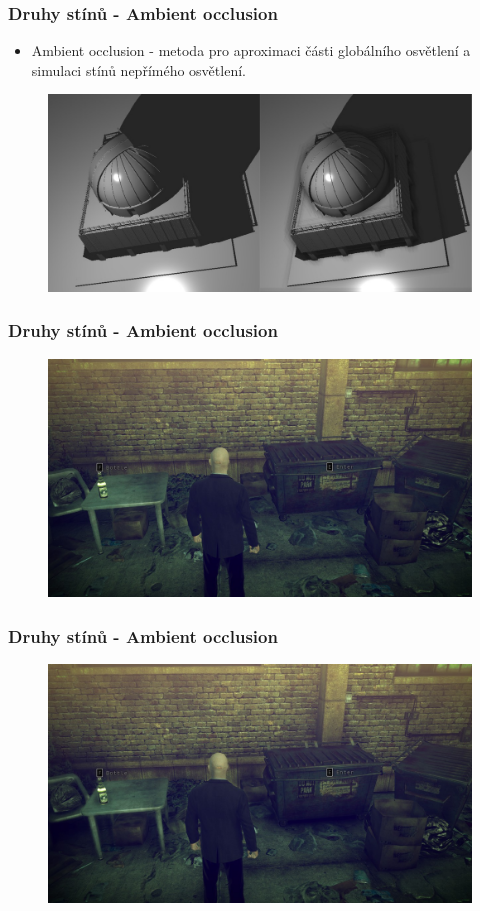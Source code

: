 \begin{frame}
  \frametitle{Druhy stínů - Ambient occlusion}
  \begin{itemize}
    \item Ambient occlusion - metoda pro aproximaci části globálního osvětlení a simulaci stínů nepřímého osvětlení.
  \end{itemize}
  \begin{figure}[h]
    \includegraphics[width=11.5cm,keepaspectratio]{pics/shadows/ambientOcclusion/difference}
  \end{figure}
\end{frame}

\begin{frame}
  \frametitle{Druhy stínů - Ambient occlusion}
  \begin{figure}[h]
    \includegraphics[width=11.5cm,keepaspectratio]{pics/shadows/ambientOcclusion/hitman}
  \end{figure}
\end{frame}

\begin{frame}
  \frametitle{Druhy stínů - Ambient occlusion}
  \begin{figure}[h]
    \includegraphics[width=11.5cm,keepaspectratio]{pics/shadows/ambientOcclusion/hitmanssao}
  \end{figure}
\end{frame}


